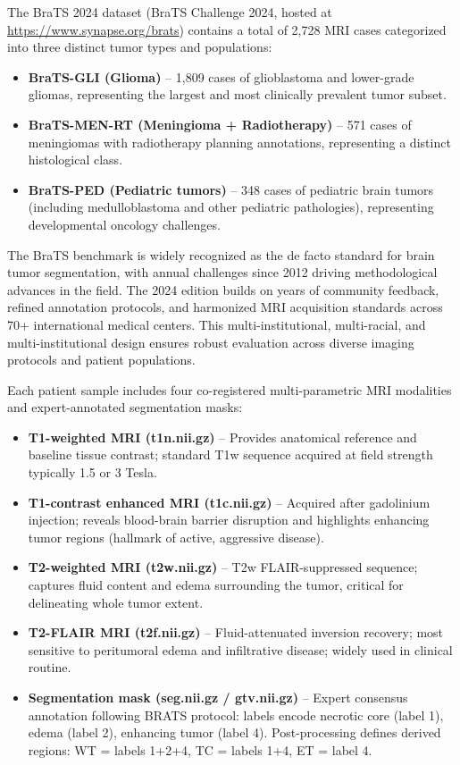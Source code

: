 \documentclass[conference]{IEEEtran}
\begin{document}
The BraTS 2024 dataset (BraTS Challenge 2024, hosted at \url{https://www.synapse.org/brats}) contains a total of 2,728 MRI cases categorized into three distinct tumor types and populations:

\begin{itemize}
\item \textbf{BraTS-GLI (Glioma)} -- 1,809 cases of glioblastoma and lower-grade gliomas, representing the largest and most clinically prevalent tumor subset.
\item \textbf{BraTS-MEN-RT (Meningioma + Radiotherapy)} -- 571 cases of meningiomas with radiotherapy planning annotations, representing a distinct histological class.
\item \textbf{BraTS-PED (Pediatric tumors)} -- 348 cases of pediatric brain tumors (including medulloblastoma and other pediatric pathologies), representing developmental oncology challenges.
\end{itemize}

The BraTS benchmark is widely recognized as the de facto standard for brain tumor segmentation, with annual challenges since 2012 driving methodological advances in the field. The 2024 edition builds on years of community feedback, refined annotation protocols, and harmonized MRI acquisition standards across 70+ international medical centers. This multi-institutional, multi-racial, and multi-institutional design ensures robust evaluation across diverse imaging protocols and patient populations.

Each patient sample includes four co-registered multi-parametric MRI modalities and expert-annotated segmentation masks:
\begin{itemize}
\item \textbf{T1-weighted MRI (t1n.nii.gz)} -- Provides anatomical reference and baseline tissue contrast; standard T1w sequence acquired at field strength typically 1.5 or 3 Tesla.
\item \textbf{T1-contrast enhanced MRI (t1c.nii.gz)} -- Acquired after gadolinium injection; reveals blood-brain barrier disruption and highlights enhancing tumor regions (hallmark of active, aggressive disease).
\item \textbf{T2-weighted MRI (t2w.nii.gz)} -- T2w FLAIR-suppressed sequence; captures fluid content and edema surrounding the tumor, critical for delineating whole tumor extent.
\item \textbf{T2-FLAIR MRI (t2f.nii.gz)} -- Fluid-attenuated inversion recovery; most sensitive to peritumoral edema and infiltrative disease; widely used in clinical routine.
\item \textbf{Segmentation mask (seg.nii.gz / gtv.nii.gz)} -- Expert consensus annotation following BRATS protocol: labels encode necrotic core (label 1), edema (label 2), enhancing tumor (label 4). Post-processing defines derived regions: WT = labels 1+2+4, TC = labels 1+4, ET = label 4.
\end{itemize}
\end{document}
